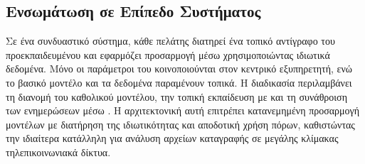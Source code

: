 \subsection{Ενσωμάτωση σε Επίπεδο Συστήματος}

Σε ένα συνδυαστικό σύστημα, κάθε πελάτης διατηρεί ένα τοπικό αντίγραφο του προεκπαιδευμένου  και εφαρμόζει προσαρμογή μέσω  χρησιμοποιώντας ιδιωτικά δεδομένα. Μόνο οι παράμετροι του  κοινοποιούνται στον κεντρικό εξυπηρετητή, ενώ το βασικό μοντέλο και τα δεδομένα παραμένουν τοπικά. Η διαδικασία περιλαμβάνει τη διανομή του καθολικού μοντέλου, την τοπική εκπαίδευση με  και τη συνάθροιση των ενημερώσεων μέσω . Η αρχιτεκτονική αυτή επιτρέπει κατανεμημένη προσαρμογή μοντέλων με διατήρηση της ιδιωτικότητας και αποδοτική χρήση πόρων, καθιστώντας την ιδιαίτερα κατάλληλη για ανάλυση αρχείων καταγραφής σε μεγάλης κλίμακας τηλεπικοινωνιακά δίκτυα.
